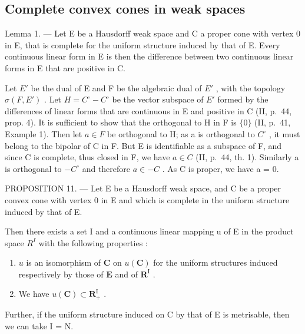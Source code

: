\subsection{Complete convex cones in weak spaces}

Lemma 1. --- Let E be a Hausdorff weak space and C a proper cone with vertex 0 in E, that is complete for the uniform structure induced by that of E. Every continuous linear form in E is then the difference between two continuous linear forms in E that are positive in C.

Let \(E'\) be the dual of E and F be the algebraic dual of \(E'\) , with the topology \(\sigma(F, E')\) . Let \(H = C^{\circ} - C^{\circ}\) be the vector subspace of \(E'\) formed by the differences of linear forms that are continuous in E and positive in C (II, p.~44, prop. 4). It is sufficient to show that the orthogonal to H in F is \(\{0\}\) (II, p.~41, Example 1). Then let \(a \in F\) be orthogonal to H; as a is orthogonal to \(C^{\circ}\) , it must belong to the bipolar of C in F. But E is identifiable as a subspace of F, and since C is complete, thus closed in F, we have \(a \in C\) (II, p.~44, th. 1). Similarly a is orthogonal to \(-C^{\circ}\) and therefore \(a \in -C\) . As C is proper, we have a = 0.

PROPOSITION 11. --- Let E be a Hausdorff weak space, and C be a proper convex cone with vertex 0 in E and which is complete in the uniform structure induced by that of E.

Then there exists a set I and a continuous linear mapping u of E in the product space \(R^{I}\) with the following properties :

\begin{enumerate}
\def\labelenumi{\alph{enumi})}
\item
  \(u\) is an isomorphism of \(\mathbf{C}\) on \(u(\mathbf{C})\) for the uniform structures induced respectively by those of \(\mathbf{E}\) and of \(\mathbf{R}^{\mathrm{I}}\) .
\item
  We have \(u(\mathbf{C}) \subset \mathbf{R}_{+}^{\mathrm{I}}\) .
\end{enumerate}

Further, if the uniform structure induced on C by that of E is metrisable, then we can take I = N.

